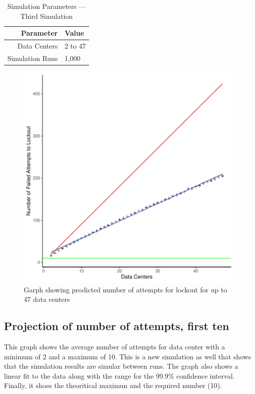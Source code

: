 \documentclass[11pt, letterpaper]{article}
\begin{document}
\begin{table}[H]
	\centering
	\caption{Simulation Parameters --- Third Simulation}
	\begin{tabular}{||r|l||}
		\hline \hline
		Parameter & Value \\ \hline \hline
		Data Centers & 2 to 47 \\ \hline
		Simulation Runs & 1,000 \\ \hline \hline
	\end{tabular}
	\label{tab:Sim3_set}
\end{table}



\begin{figure}[H]
\centering
\includegraphics{Report-007}
	\caption{Garph showing prodicted number of attempts for lockout for up to 47
	data centers}
	\label{fig:plot_3}
\end{figure}

\subsection{Projection of number of attempts, first ten}
This graph shows the average number of attempts for data center
with a minimum of 2 and a maximum of 10. This is a new simulation as well that
shows that the simulation results are simular between runs. The graph also shows a linear
fit to the data along with the range for the 99.9\% confidence interval. Finally,
it shoes the theoritical maximun and the required number (10).
\end{document}
